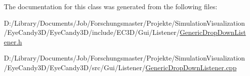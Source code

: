 The documentation for this class was generated from the following files\+:\begin{DoxyCompactItemize}
\item 
D\+:/\+Library/\+Documents/\+Job/\+Forschungsmaster/\+Projekte/\+Simulation\+Visualization/\+Eye\+Candy3\+D/\+Eye\+Candy3\+D/include/\+E\+C3\+D/\+Gui/\+Listener/\mbox{\hyperlink{_generic_drop_down_listener_8h}{Generic\+Drop\+Down\+Listener.\+h}}\item 
D\+:/\+Library/\+Documents/\+Job/\+Forschungsmaster/\+Projekte/\+Simulation\+Visualization/\+Eye\+Candy3\+D/\+Eye\+Candy3\+D/src/\+Gui/\+Listener/\mbox{\hyperlink{_generic_drop_down_listener_8cpp}{Generic\+Drop\+Down\+Listener.\+cpp}}\end{DoxyCompactItemize}
